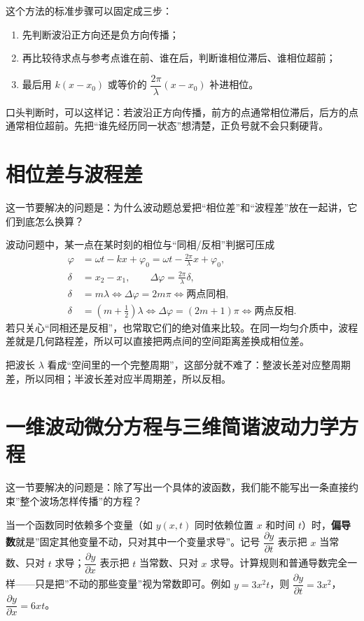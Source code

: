 \documentclass[lang=cn,11pt]{elegantbook}
\begin{document}
这个方法的标准步骤可以固定成三步：
\begin{enumerate}
  \item 先判断波沿正方向还是负方向传播；
  \item 再比较待求点与参考点谁在前、谁在后，判断谁相位滞后、谁相位超前；
  \item 最后用 \(k(x-x_0)\) 或等价的 \(\dfrac{2\pi}{\lambda}(x-x_0)\) 补进相位。
\end{enumerate}

\begin{note}
口头判断时，可以这样记：若波沿正方向传播，前方的点通常相位滞后，后方的点通常相位超前。先把“谁先经历同一状态”想清楚，正负号就不会只剩硬背。
\end{note}

\section{相位差与波程差}

这一节要解决的问题是：为什么波动题总爱把“相位差”和“波程差”放在一起讲，它们到底怎么换算？

波动问题中，某一点在某时刻的相位与“同相/反相”判据可压成
\[
\begin{aligned}
\varphi&=\omega t-kx+\varphi_0=\omega t-\frac{2\pi}{\lambda}x+\varphi_0,\\
\delta&=x_2-x_1,\qquad
\Delta\varphi=\frac{2\pi}{\lambda}\delta,\\
\delta&=m\lambda
\iff \Delta\varphi=2m\pi
\iff \text{两点同相},\\
\delta&=\left(m+\frac12\right)\lambda
\iff \Delta\varphi=(2m+1)\pi
\iff \text{两点反相}.
\end{aligned}
\]
若只关心“同相还是反相”，也常取它们的绝对值来比较。在同一均匀介质中，波程差就是几何路程差，所以可以直接把两点间的空间距离差换成相位差。

\begin{remark}
把波长 \(\lambda\) 看成“空间里的一个完整周期”，这部分就不难了：整波长差对应整周期差，所以同相；半波长差对应半周期差，所以反相。
\end{remark}

\section{一维波动微分方程与三维简谐波动力学方程}

这一节要解决的问题是：除了写出一个具体的波函数，我们能不能写出一条直接约束”整个波场怎样传播”的方程？

\begin{definition}[偏导数]\label{def:partial-derivative}
当一个函数同时依赖多个变量（如 \(y(x,t)\) 同时依赖位置 \(x\) 和时间 \(t\)）时，\textbf{偏导数}就是”固定其他变量不动，只对其中一个变量求导”。记号 \(\dfrac{\partial y}{\partial t}\) 表示把 \(x\) 当常数、只对 \(t\) 求导；\(\dfrac{\partial y}{\partial x}\) 表示把 \(t\) 当常数、只对 \(x\) 求导。计算规则和普通导数完全一样——只是把”不动的那些变量”视为常数即可。例如 \(y=3x^2t\)，则 \(\dfrac{\partial y}{\partial t}=3x^2\)，\(\dfrac{\partial y}{\partial x}=6xt\)。
\end{definition}
\end{document}
